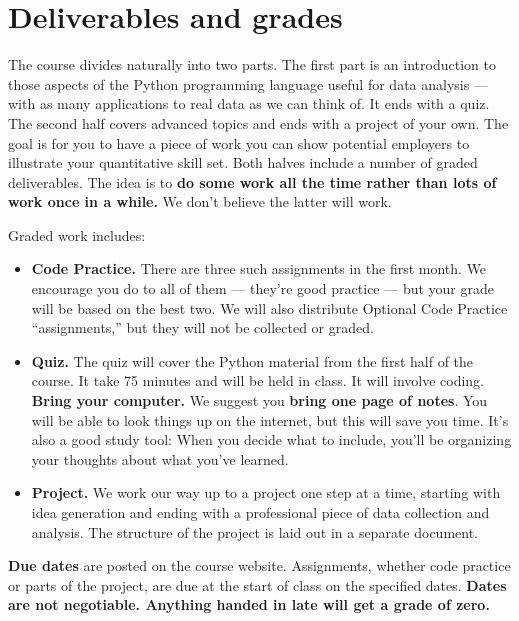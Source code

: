 \documentclass[11pt]{article}
\begin{document}
\section*{Deliverables and grades}

The course divides naturally into two parts.
The first part is an introduction to those aspects of the Python programming language
useful for data analysis --- with as many applications to real data as we can think of.
It ends with a quiz.
The second half covers advanced topics and ends with a project of your own.
The goal is for you to have a piece of work you can show potential employers to
illustrate your quantitative skill set.
Both halves include a number of graded deliverables.
The idea is to {\bf do some work all the time rather than lots of work once in a while.}
We don't believe the latter will work.

Graded work includes:
%
\begin{itemize}

\item {\bf Code Practice.\/}
There are three such assignments in the first month.
We encourage you do to all of them --- they're good practice ---
but your grade will be based on the best two.
We will also distribute Optional Code Practice ``assignments,''
but they will not be collected or graded.

\item {\bf Quiz.\/}
The quiz will cover the Python material from the first half of the course.
It take 75 minutes and will be held in class.
It will involve coding.
{\bf Bring your computer.\/}
We suggest you {\bf bring one page of notes\/}.
You will be able to look things up on the internet, but this will save you time.
It's also a good study tool:  When you decide what to include,
you'll be organizing your thoughts about what you've learned.

\item {\bf Project.\/}
We work our way up to a project one step at a time, starting with idea generation and ending
with a professional piece of data collection and analysis.
The structure of the project is laid out in a separate document.

\end{itemize}


{\bf Due dates} are posted on the course website.
Assignments, whether code practice or parts of the project,
are due at the start of class on the specified dates.
{\bf Dates are not negotiable.
Anything handed in late will get a grade of zero.\/}
\end{document}
